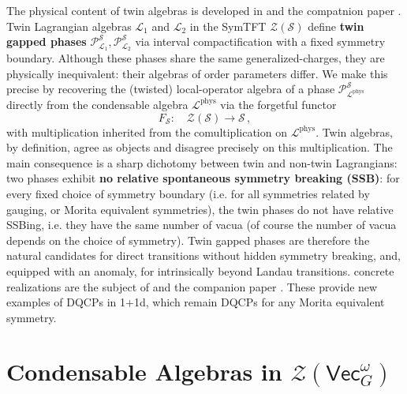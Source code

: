 \documentclass[aps,twocolumn,prx,floatfix,preprintnumbers, nofootinbib,10pt]{revtex4-2}
\numberwithin{equation}{section}
\theoremstyle{definition}
\newcommand{\be}{\begin{equation}}
\newcommand{\ee}{\end{equation}}
\newcommand{\cL}{\mathcal{L}}
\newcommand{\cZ}{\mathcal{Z}}
\renewcommand{\Vec}{\mathsf{Vec}}
\newcommand{\phys}{\text{phys}}
\begin{document}
\vspace{2mm}
The physical content of twin algebras is developed in  and the compatnion paper \cite{WGS}. Twin Lagrangian algebras $\cL_1$ and $\cL_2$ in the
SymTFT $\cZ(\mathcal{S})$ define \textbf{twin gapped phases}
$\mathcal{P}^{\mathcal{S}}_{\cL_1},\mathcal{P}^{\mathcal{S}}_{\cL_2}$ via
interval compactification with a fixed symmetry boundary. Although these
phases share the same generalized-charges, they are physically
inequivalent: their algebras of order parameters differ. We make this
precise by recovering the (twisted) local-operator algebra of a phase
$\mathcal{P}^{\mathcal{S}}_{\cL^\phys}$ directly from the
condensable algebra $\cL^{\phys}$ via the forgetful functor
\be
F_{{\mathcal{S}}}:\quad \cZ(\mathcal{S})\to\mathcal{S} \,,
\ee
with multiplication
inherited from the comultiplication on $\cL^{\phys}$. Twin algebras,
by definition, agree as objects and disagree precisely on this
multiplication. The main consequence is a sharp dichotomy between twin and non-twin Lagrangians: 
two phases exhibit \textbf{no relative
spontaneous symmetry breaking (SSB)}:
for every fixed choice of symmetry boundary (i.e. for all symmetries related by gauging, or Morita equivalent symmetries), the  twin phases do not have relative SSBing, i.e. they have the same number of vacua (of course the number of vacua depends on the choice of symmetry). Twin gapped phases are therefore the natural candidates for direct transitions 
without hidden symmetry breaking, and, equipped with an anomaly, for intrinsically beyond Landau transitions. 
concrete realizations are the
subject of  and the companion paper \cite{WGS}. These provide new examples of DQCPs \cite{Senthil:2023vqd} in 1+1d, which remain DQCPs for any Morita equivalent symmetry. 











\section{Condensable Algebras in $\cZ(\Vec_G^\omega)$}
\label{sec:algebras}
\end{document}
